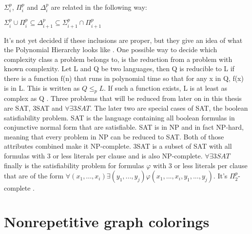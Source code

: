 \documentclass[12pt,a4paper]{article}
\begin{document}
\newline
$\Sigma^p_i$, $\Pi^p_i$ and $\Delta^p_i$ are related in the following way:
\begin{center}
	$\Sigma^p_i \cup \Pi^p_i \subseteq \Delta^p_{i+1} \subseteq \Sigma^p_{i+1} \cap \Pi^p_{i+1}$
\end{center}
It's not yet decided if these inclusions are proper, but they give an idea of what the Polynomial Hierarchy looks like \citep{Stockmeyer1976}.
\newline
One possible way to decide which complexity class a problem belongs to, is the reduction from a problem with known complexity. Let L and Q be two languages, then Q is reducible to L if there is a function f(n) that runs in polynomial time so that for any x in Q, f(x) is in L. This is written as $Q \leq_p L$. If such a function exists, L is at least as complex as Q \citep{Davis1983}. 
\newline
Three problems that will be reduced from later on in this thesis are SAT, 3SAT and $\forall \exists 3SAT$. The later two are special cases of SAT, the boolean satisfiability problem. SAT is the language containing all boolean formulas in conjunctive normal form that are satisfiable. SAT is in NP and in fact NP-hard, meaning that every problem in NP can be reduced to SAT. Both of those attributes combined make it NP-complete. \citep[p. 338-346]{Davis1983} 3SAT is a subset of SAT with all formulas with 3 or less literals per clause and is also NP-complete. \citep[p. 347]{Davis1983} $\forall \exists 3SAT$ finally is the satisfiability problem for formulas $\varphi$ with 3 or less literals per clause that are of the form $\forall (x_1, ..., x_i) \exists (y_1, ..., y_j) \varphi(x_1, ..., x_i, y_1, ..., y_j)$. It's $\Pi^p_2$-complete \citep{Schaefer2002}.

\newpage
\section{Nonrepetitive graph colorings}
\end{document}
